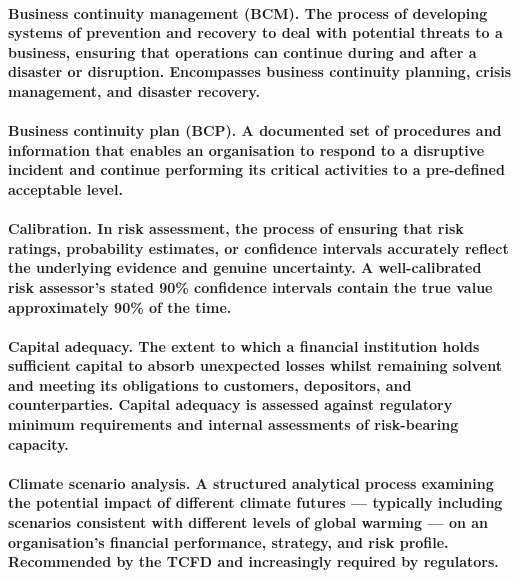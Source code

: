 \paragraph{\textbf{Business continuity management (BCM)}. The process of developing systems of prevention and recovery to deal with potential threats to a business, ensuring that operations can continue during and after a disaster or disruption. Encompasses business continuity planning, crisis management, and disaster recovery.}

\paragraph{\textbf{Business continuity plan (BCP)}. A documented set of procedures and information that enables an organisation to respond to a disruptive incident and continue performing its critical activities to a pre-defined acceptable level.}

\paragraph{\textbf{Calibration}. In risk assessment, the process of ensuring that risk ratings, probability estimates, or confidence intervals accurately reflect the underlying evidence and genuine uncertainty. A well-calibrated risk assessor's stated 90\% confidence intervals contain the true value approximately 90\% of the time.}

\paragraph{\textbf{Capital adequacy}. The extent to which a financial institution holds sufficient capital to absorb unexpected losses whilst remaining solvent and meeting its obligations to customers, depositors, and counterparties. Capital adequacy is assessed against regulatory minimum requirements and internal assessments of risk-bearing capacity.}

\paragraph{\textbf{Climate scenario analysis}. A structured analytical process examining the potential impact of different climate futures — typically including scenarios consistent with different levels of global warming — on an organisation's financial performance, strategy, and risk profile. Recommended by the TCFD and increasingly required by regulators.}

